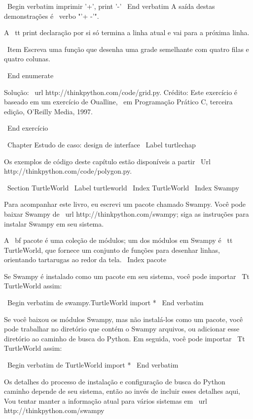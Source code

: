 \documentclass[10pt]{book}
\begin{document}
{\ Begin {verbatim}
imprimir '+', 
print '-'
\ End {verbatim}
%
A saída destas demonstrações é \ verbo "'+ -'".

A {\ tt print} declaração por si só termina a linha atual e
vai para a próxima linha.

\ Item Escreva uma função que desenha uma grade semelhante
com quatro filas e quatro colunas.

\ End {enumerate}

Solução: \ url {http://thinkpython.com/code/grid.py}.
Crédito: Este exercício é baseado em um exercício de Oualline, {\ em
    Programação Prático C, terceira edição}, O'Reilly Media, 1997.

\ End {} exercício





\ Chapter {Estudo de caso: design de interface}
\ Label {} turtlechap

Os exemplos de código deste capítulo estão disponíveis a partir
\ Url {http://thinkpython.com/code/polygon.py}.


\ Section {} TurtleWorld
\ Label {} turtleworld
\ Index {} TurtleWorld
\ Index {} Swampy

Para acompanhar este livro, eu escrevi um pacote chamado Swampy.
Você pode baixar Swampy de \ url {http://thinkpython.com/swampy};
siga as instruções para instalar Swampy em seu sistema.

A {\ bf pacote} é uma coleção de módulos; um dos módulos em
Swampy é {\ tt TurtleWorld}, que fornece um conjunto de funções para
desenhar linhas, orientando tartarugas ao redor da tela.
\ Index {pacote}

Se Swampy é instalado como um pacote em seu sistema, você pode importar
{\ Tt TurtleWorld} assim:

\ Begin {verbatim}
de swampy.TurtleWorld import *
\ End {verbatim}

Se você baixou os módulos Swampy, mas não instalá-los como um
pacote, você pode trabalhar no diretório que contém o Swampy
arquivos, ou adicionar esse diretório ao caminho de busca do Python. Em seguida, você pode importar
{\ Tt TurtleWorld} assim:

\ Begin {verbatim}
de TurtleWorld import *
\ End {verbatim}

Os detalhes do processo de instalação e configuração de busca do Python
caminho depende de seu sistema, então ao invés de incluir esses detalhes aqui,
Vou tentar manter a informação atual para vários sistemas
em \ url {http://thinkpython.com/swampy}

}
\end{document}
